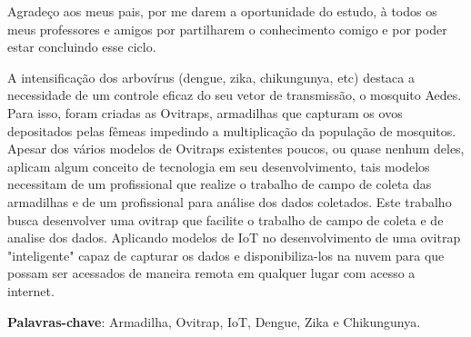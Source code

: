 \documentclass[
	12pt,				%
	openright,			%
	oneside,			%
	a4paper,			%
	chapter=TITLE,		%
	english,			%
	brazil				%
	]{abntex2}
\begin{document}

\begin{agradecimentos}
Agradeço aos meus pais, por me darem a oportunidade do estudo, à todos os meus professores e amigos por partilharem o conhecimento 
comigo e por poder estar concluindo esse ciclo.

\end{agradecimentos}




\setlength{\absparsep}{18pt} %

\begin{resumo}

A intensificação dos arbovírus (dengue, zika, chikungunya, etc) destaca a necessidade de um controle eficaz do seu vetor de transmissão, 
o mosquito Aedes. Para isso, foram criadas as Ovitraps, armadilhas que capturam os ovos depositados pelas fêmeas impedindo a multiplicação 
da população de mosquitos. Apesar dos vários modelos de Ovitraps existentes poucos, ou quase nenhum deles, aplicam algum conceito de tecnologia
 em seu desenvolvimento, tais modelos necessitam de um profissional que realize o trabalho de campo de coleta das armadilhas e de um 
 profissional para análise dos dados coletados. Este trabalho busca desenvolver uma ovitrap que facilite o trabalho de campo de coleta 
 e de analise dos dados. Aplicando modelos de IoT no desenvolvimento de uma ovitrap "inteligente" capaz de capturar os dados e 
 disponibiliza-los na nuvem para que possam ser acessados de maneira remota em qualquer lugar com acesso a internet.

\textbf{Palavras-chave}:  Armadilha, Ovitrap, IoT, Dengue, Zika e Chikungunya.

\end{resumo}
\end{document}
